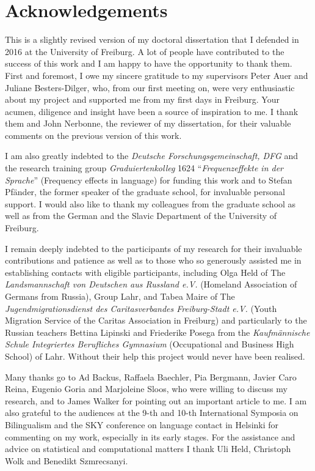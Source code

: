 \chapter*{Acknowledgements}

This is a slightly revised version of my doctoral dissertation that I defended in 2016 at the University of Freiburg. A lot of people have contributed to the success of this work and I am happy to have the opportunity to thank them. First and foremost, I owe my sincere gratitude to my supervisors Peter Auer and Juliane Besters-Dilger, who, from our first meeting on, were very enthusiastic about my project and supported me from my first days in Freiburg. Your acumen, diligence and insight have been a source of inspiration to me. I thank them and John Nerbonne, the reviewer of my dissertation, for their valuable comments on the previous version of this work. 

 I am also greatly indebted to the \textit{Deutsche Forschungsgemeinschaft, DFG} and the research training group \textit{Graduiertenkolleg} 1624 ``\textit{Frequenzeffekte in der Sprache}'' (Frequency effects in language) for funding this work and to Stefan Pfänder, the former speaker of the graduate school, for invaluable personal support. I would also like to thank my colleagues from the graduate school as well as from the German and the Slavic Department of the University of Freiburg.

I remain deeply indebted to the participants of my research for their invaluable contributions and patience as well as to those who so generously assisted me in establishing contacts with eligible participants, including Olga Held of The \textit{Landsmannschaft von Deutschen aus Russland e.V.} (Homeland Association of Germans from Russia), Group Lahr, and Tabea Maire of The \textit{Jugendmigrationsdienst des Caritasverbandes Freiburg-Stadt e.V.} (Youth Migration Service of the Caritas Association in Freiburg) and particularly to the Russian teachers Bettina Lipinski and Friederike Posega from the \textit{Kaufmännische Schule Integriertes Berufliches Gymnasium} (Occupational and Business High School) of Lahr. Without their help this project would never have been realised.

Many thanks go to Ad Backus, Raffaela Baechler, Pia Bergmann, Javier Caro Reina, Eugenio Goria and Marjoleine Sloos, who were willing to discuss my research, and to James Walker for pointing out an important article to me. I am also grateful to the audiences at the 9-th and 10-th International Symposia on Bilingualism and the SKY conference on language contact in Helsinki for commenting on my work, especially in its early stages. For the assistance and advice on statistical and computational matters I thank Uli Held, Christoph Wolk and Benedikt Szmrecsanyi.

